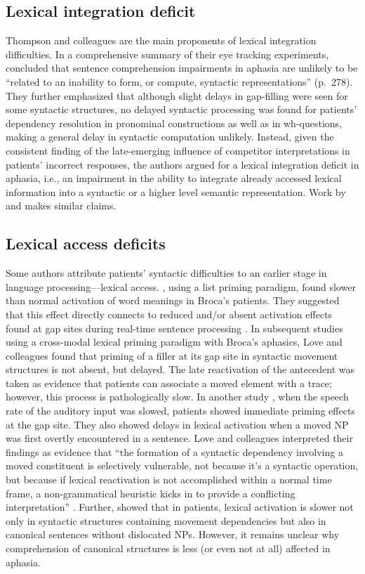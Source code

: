 \documentclass{cambridge7A}\usepackage[]{graphicx}\usepackage[]{color}
\begin{document}
\subsection{Lexical integration deficit}
Thompson and colleagues are the main proponents of lexical integration difficulties.
In a comprehensive summary of their eye tracking experiments, \cite{ThompsonChoy-2009} concluded that sentence comprehension impairments in aphasia are unlikely to be ``related to an inability to form, or compute, syntactic representations'' (p.\ 278). They further emphasized that although slight delays in gap-filling were seen for some syntactic structures, no delayed syntactic processing was found for patients' dependency resolution in pronominal constructions as well as in wh-questions, making a general delay in syntactic computation unlikely. Instead, given the consistent finding of the late-emerging influence of competitor interpretations in patients' incorrect responses, the authors  argued for a lexical integration deficit in aphasia, i.e., an impairment in the ability to integrate already accessed lexical information into a syntactic or a higher level semantic representation. Work by \cite{hagoort1996lexical} and \cite{SwaabEtAl-1997} makes similar claims.

\subsection{Lexical access deficits}
Some authors attribute patients' syntactic difficulties to an earlier stage in language processing---lexical access.
\cite{Prather:1997}, using a list priming paradigm, found slower than normal activation of word meanings in Broca's patients. They suggested that this effect directly connects to reduced and/or absent activation effects found at gap sites during real-time sentence processing \citep{Zurif1994}. 
In subsequent studies using a  cross-modal lexical priming paradigm with Broca's aphasics, Love and colleagues \citep{Swinney1996,Love2001} found that priming of a filler at its gap site in syntactic movement structures is not absent, but delayed. The late reactivation of the antecedent was taken as evidence that patients can associate a moved element with a trace; however, this process is pathologically slow.
In another study \citep{Love:2008}, when the speech rate of the auditory input was slowed, patients showed immediate priming effects at the gap site. They also showed delays in lexical activation when a moved NP was first overtly encountered in a sentence. Love and colleagues interpreted their findings as evidence that ``the formation of a syntactic dependency involving a moved constituent is selectively vulnerable, not because it's a syntactic operation, but because if lexical reactivation is not accomplished within a normal time frame, a non-grammatical heuristic kicks in to provide a conflicting interpretation'' \citep[][p.~216]{Love:2008}. Further, \cite{Ferrill2012} showed that in patients, lexical activation is slower not only in syntactic structures containing movement dependencies but also in canonical sentences without dislocated NPs. However, it remains unclear why comprehension of canonical structures is less (or even not at all) affected in aphasia.
\end{document}
